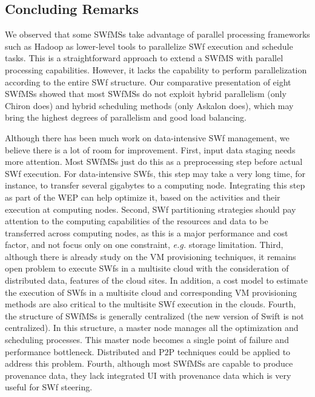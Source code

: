 \subsection{Concluding Remarks}

We observed that some SWfMSs take advantage of parallel processing
frameworks such as Hadoop as lower-level tools
to parallelize SWf execution and schedule tasks. This is a
straightforward approach to extend a SWfMS with parallel processing capabilities. However, it lacks the capability to perform parallelization according to the entire SWf structure.
Our comparative presentation of eight SWfMSs showed that most SWfMSs do
not exploit hybrid parallelism (only Chiron does) and hybrid scheduling methods (only Askalon does), which may bring the highest degrees of parallelism and good load balancing.

Although there has been much work on data-intensive SWf management, we believe there is a lot of room for improvement.
First, input data staging needs more attention. Most SWfMSs just do
this as a preprocessing step before actual SWf execution.
For data-intensive SWfs, this step may take a very
long time, for instance,
to transfer several gigabytes to a computing node.
Integrating this step as part of the WEP can help optimize it, based
on the activities and their execution at computing nodes.
Second, SWf partitioning strategies should pay attention to the
computing capabilities of the resources and data to be transferred
across computing nodes, as this is a major performance and cost factor,
and not focus only on one constraint, \textit{e.g.} storage limitation.
Third, although there is already study on the VM provisioning techniques, it remains open problem to execute SWfs in a multisite cloud with the consideration of distributed data, features of the cloud sites. In addition, a cost model to estimate the execution of SWfs in a multisite cloud and corresponding VM provisioning methods are also critical to the multisite SWf execution in the clouds.
Fourth, the structure of SWfMSs is generally centralized (the new version of Swift is not centralized). In this
structure, a master node manages all the optimization and scheduling
processes. This master node becomes a single point of failure and
performance bottleneck. 
Distributed and P$2$P techniques \cite{Pacitti2012a} could be applied to address this problem.
Fourth, although most SWfMSs are capable to produce provenance data,
they lack integrated UI with provenance data which is very useful for
SWf steering.

